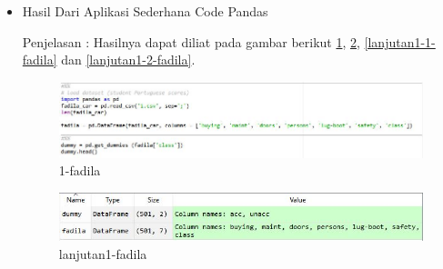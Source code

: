 \begin{enumerate}
\begin{itemize}
\begin{lstlisting}
dummy = pd.get_dummies (fadila['class'])
dummy.head()
\end{lstlisting}
\begin{enumerate}
\item Baris 1 : Mengimport Library Pandas sebagai pd
\item Baris 2 : Membuat variabel fadila\_car dimana membaca dataset berupa format csv "1.csv" dengan separator.
\item Baris 3 : Menampilkan hasil dari variabel fadila\_car ( berupa jumlah/angka karena len )
\item Baris 4 : Membuat variabel fadila dimana mengambil/ memanggil DataFrame dari library pd ( pandas ) dengan parameter variabel.
\item Baris 5 : Mendefinisikan variabel dummy dimana memanggil get\_dummies dari pd dengan parameter variabel fadila dan column class
\item Baris 6 : Menampilkan 5 data teratas pada kolom class dari variabel fadila
\end{enumerate}
\item Hasil Dari Aplikasi Sederhana Code Pandas
\par Penjelasan : Hasilnya dapat diliat pada gambar berikut \ref{1-fadila}, \ref{lanjutan1-fadila}, \ref{lanjutan1-1-fadila} dan \ref{lanjutan1-2-fadila}.
\begin{figure}[!hbtp]
\centering
\includegraphics[scale=0.3]{figures/1-fadila.jpg}
\caption{1-fadila}
\label{1-fadila}
\end{figure}
\par
\par
\begin{figure}[!hbtp]
\centering
\includegraphics[scale=0.3]{figures/lanjutan1-fadila.jpg}
\caption{lanjutan1-fadila}
\label{lanjutan1-fadila}
\end{figure}
\par
\par
\begin{figure}[!hbtp]
\centering

\end{figure}
\end{itemize}
\end{enumerate}
